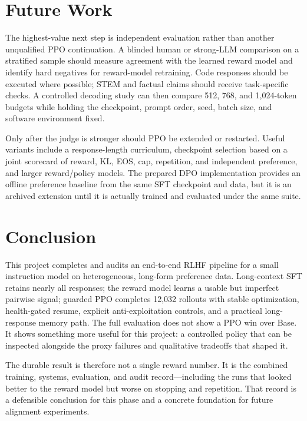 \documentclass[11pt]{article}
\begin{document}
\section{Future Work}

The highest-value next step is independent evaluation rather than another
unqualified PPO continuation. A blinded human or strong-LLM comparison on a
stratified sample should measure agreement with the learned reward model and
identify hard negatives for reward-model retraining. Code responses should be
executed where possible; STEM and factual claims should receive task-specific
checks. A controlled decoding study can then compare 512, 768, and 1,024-token
budgets while holding the checkpoint, prompt order, seed, batch size, and
software environment fixed.

Only after the judge is stronger should PPO be extended or restarted. Useful
variants include a response-length curriculum, checkpoint selection based on a
joint scorecard of reward, KL, EOS, cap, repetition, and independent preference,
and larger reward/policy models. The prepared DPO implementation provides an
offline preference baseline from the same SFT checkpoint and data, but it is an
archived extension until it is actually trained and evaluated under the same
suite.

\section{Conclusion}

This project completes and audits an end-to-end RLHF pipeline for a small
instruction model on heterogeneous, long-form preference data. Long-context SFT
retains nearly all responses; the reward model learns a usable but imperfect
pairwise signal; guarded PPO completes 12,032 rollouts with stable optimization,
health-gated resume, explicit anti-exploitation controls, and a practical
long-response memory path. The full evaluation does not show a PPO win over
Base. It shows something more useful for this project: a controlled policy that
can be inspected alongside the proxy failures and qualitative tradeoffs that
shaped it.

The durable result is therefore not a single reward number. It is the combined
training, systems, evaluation, and audit record---including the runs that looked
better to the reward model but worse on stopping and repetition. That record is
a defensible conclusion for this phase and a concrete foundation for future
alignment experiments.
\end{document}
